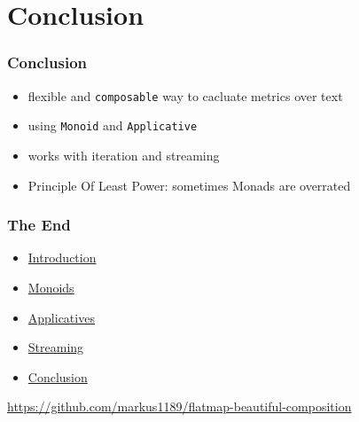 \documentclass[aspectratio=169]{beamer}
\begin{document}
\section{Conclusion}\label{sec:conclusion}

\begin{frame}
  \frametitle{Conclusion}
  \begin{itemize}
  \item flexible and \texttt{composable} way to cacluate metrics over text
  \item using \texttt{Monoid} and \texttt{Applicative}
  \item works with iteration and streaming
  \item Principle Of Least Power: sometimes Monads are overrated
  \end{itemize}
\end{frame}

\begin{frame}
  \frametitle{The End}
  \begin{itemize}
  \item \hyperref[sec:introduction]{Introduction}
  \item \hyperref[sec:monoids]{Monoids}
  \item \hyperref[sec:applicatives]{Applicatives}
  \item \hyperref[sec:streaming]{Streaming}
  \item \hyperref[sec:conclusion]{Conclusion}
  \end{itemize}
  \vfill
  \begin{center}
    \url{https://github.com/markus1189/flatmap-beautiful-composition}
  \end{center}
\end{frame}

\appendix{}
\end{document}
